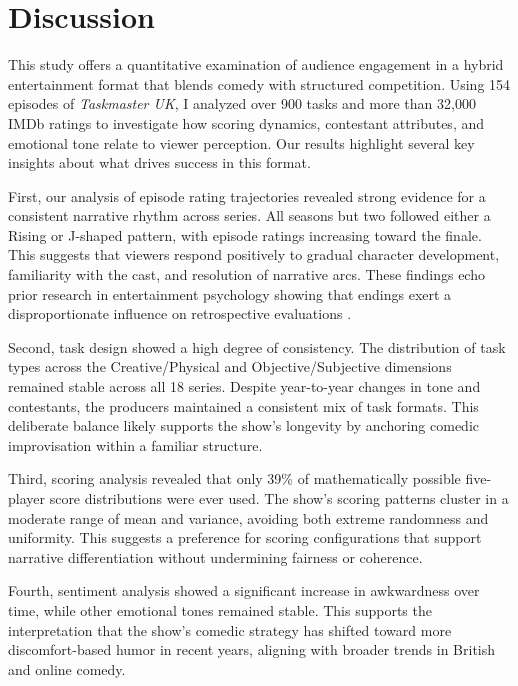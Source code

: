 \documentclass[10pt,letterpaper]{article}
\begin{document}

\section*{Discussion}

This study offers a quantitative examination of audience engagement in a hybrid entertainment format that blends comedy with structured competition. Using 154 episodes of \textit{Taskmaster UK}, I analyzed over 900 tasks and more than 32,000 IMDb ratings to investigate how scoring dynamics, contestant attributes, and emotional tone relate to viewer perception. Our results highlight several key insights about what drives success in this format.

First, our analysis of episode rating trajectories revealed strong evidence for a consistent narrative rhythm across series. All seasons but two followed either a Rising or J-shaped pattern, with episode ratings increasing toward the finale. This suggests that viewers respond positively to gradual character development, familiarity with the cast, and resolution of narrative arcs. These findings echo prior research in entertainment psychology showing that endings exert a disproportionate influence on retrospective evaluations \cite{Fredrickson1993, Rozin2004}.

Second, task design showed a high degree of consistency. The distribution of task types across the Creative/Physical and Objective/Subjective dimensions remained stable across all 18 series. Despite year-to-year changes in tone and contestants, the producers maintained a consistent mix of task formats. This deliberate balance likely supports the show’s longevity by anchoring comedic improvisation within a familiar structure.

Third, scoring analysis revealed that only 39\% of mathematically possible five-player score distributions were ever used. The show's scoring patterns cluster in a moderate range of mean and variance, avoiding both extreme randomness and uniformity. This suggests a preference for scoring configurations that support narrative differentiation without undermining fairness or coherence.

Fourth, sentiment analysis showed a significant increase in awkwardness over time, while other emotional tones remained stable. This supports the interpretation that the show's comedic strategy has shifted toward more discomfort-based humor in recent years, aligning with broader trends in British and online comedy.
\end{document}
